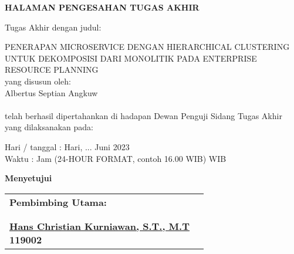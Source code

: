 \vspace*{0cm}

\begin{center}		
	{\large \bfseries HALAMAN PENGESAHAN TUGAS AKHIR \\}
\end{center}
		
\vspace{2cm}

\noindent Tugas Akhir dengan judul:

\noindent PENERAPAN MICROSERVICE DENGAN HIERARCHICAL CLUSTERING UNTUK DEKOMPOSISI DARI MONOLITIK PADA ENTERPRISE RESOURCE PLANNING\\

\noindent yang disusun oleh: \\
\noindent Albertus Septian Angkuw \\
 \\

\noindent telah berhasil dipertahankan di hadapan Dewan Penguji Sidang Tugas Akhir yang dilaksanakan pada: 

\begin{tabs}{3cm}
	\noindent Hari / tanggal \tab : Hari, ... Juni 2023 \\
	\noindent Waktu \tab : Jam (24-HOUR FORMAT, contoh 16.00 WIB) WIB
\end{tabs}

\vspace{3.2cm}
\begin{center}	
\textbf{Menyetujui} \\
\end{center}

\begin{longtable}{p{6.5cm} p{6.5cm}}
	\centering \textbf{Pembimbing Utama:}  \\
	
	\cr \\ \\
		
	\centering \textbf{ \underline{Hans Christian Kurniawan, S.T., M.T} \\ 119002} \\
	
\end{longtable}